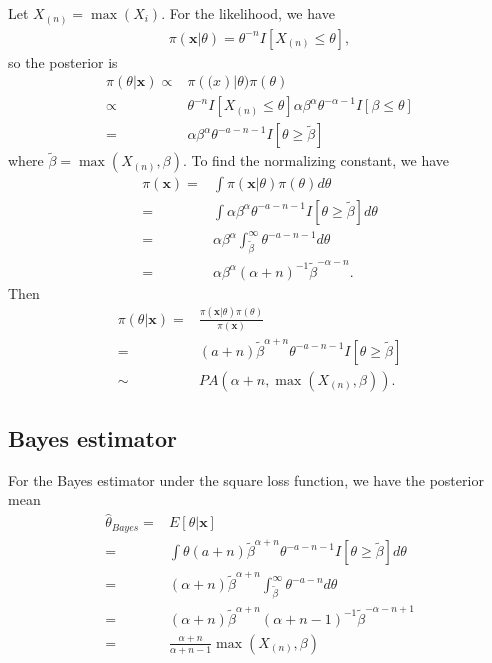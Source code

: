 \documentclass[12pt]{article}
\begin{document}
Let $X_{(n)} = \max(X_i)$.
For the likelihood, we have
\begin{align*}
  \pi(\bm{x} | \theta) = \theta^{-n} I[X_{(n)} \leq \theta],
\end{align*}
so the posterior is
\begin{align*}
  \pi(\theta | \bm{x})
  \propto & \pi(\bm(x) | \theta) \pi(\theta) \\ 
  \propto & \theta^{-n} I[X_{(n)} \leq \theta] \alpha \beta^\alpha \theta^{-\alpha-1} I[\beta \leq \theta]\\
  = & \alpha \beta^\alpha \theta^{-a-n-1} I[\theta \geq \tilde{\beta}]
\end{align*}
where $\tilde{\beta} = \max(X_{(n)}, \beta)$.
To find the normalizing constant, we have
\begin{align*}
  \pi(\bm{x}) = &  \int \pi(\bm{x} | \theta) \pi(\theta) d\theta \\
  = & \int \alpha \beta^\alpha \theta^{-a-n-1} I[\theta \geq \tilde{\beta}] d\theta \\
  = & \alpha \beta^\alpha \int_{\tilde{\beta}}^\infty \theta^{-a-n-1} d\theta \\
  = & \alpha \beta^\alpha (\alpha+n)^{-1} \tilde{\beta}^{-\alpha-n}.
\end{align*}
Then
\begin{align*}
  \pi(\theta | \bm{x})
  = & \frac{\pi(\bm{x}|\theta) \pi(\theta)}{\pi(\bm{x})} \\
  = & (a+n) \tilde{\beta}^{\alpha+n} \theta^{-a-n-1} I[\theta \geq \tilde{\beta}] \\
  \sim & PA(\alpha+n, \max(X_{(n)}, \beta)).
\end{align*}

\subsection{Bayes estimator}

For the Bayes estimator under the square loss function,
we have the posterior mean
\begin{align*}
  \hat{\theta}_{Bayes}
  = & E[\theta | \bm{x}] \\
  = & \int \theta (a+n) \tilde{\beta}^{\alpha+n} \theta^{-a-n-1} I[\theta \geq \tilde{\beta}] d\theta \\
  = & (\alpha+n) \tilde{\beta}^{\alpha+n} \int_{\tilde{\beta}}^\infty \theta^{-a-n} d\theta \\
  = & (\alpha+n) \tilde{\beta}^{\alpha+n} (\alpha+n-1)^{-1} \tilde{\beta}^{-\alpha-n+1} \\
  = & \frac{\alpha+n}{\alpha+n-1} \max(X_{(n)}, \beta)
\end{align*}
\end{document}
